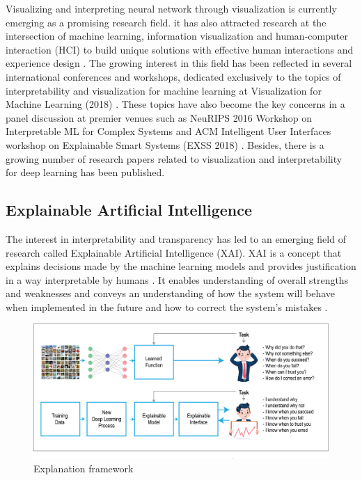 Visualizing and interpreting neural network through visualization is currently emerging as a promising research field. it has also attracted research at the intersection of machine learning, information visualization and human-computer interaction (HCI) to build unique solutions with effective human interactions and experience design \cite{Dudley2018}. The growing interest in this field has been reflected in several international conferences and workshops, dedicated exclusively to the topics of interpretability and visualization for machine learning at Visualization for Machine Learning (2018) \cite{visml2018}. These topics have also become the key concerns in a panel discussion at premier venues such as NeuRIPS 2016 Workshop on Interpretable ML for Complex Systems \cite{imlcs2016}and ACM Intelligent User Interfaces workshop on Explainable Smart Systems (EXSS 2018) \cite{exss2018}. Besides, there is a growing number of research papers related to visualization and interpretability for deep learning has been published.

\subsection{Explainable Artificial Intelligence}

The interest in interpretability and transparency has led to an emerging field of research called Explainable Artificial Intelligence (XAI). XAI is a concept that explains decisions made by the machine learning models and provides justification in a way interpretable by humans \cite{Gunning}. It enables understanding of overall strengths and weaknesses and conveys an understanding of how the system will behave when implemented in the future and how to correct the system’s mistakes \cite{Gunning}.

\begin{figure}[htbp]
\centering
\includegraphics[width=1\textwidth]{images/XAI-concept-copy.eps}
\caption{Explanation framework \protect\footnotemark}
\label{fig:Explanation framework}
\end{figure}

